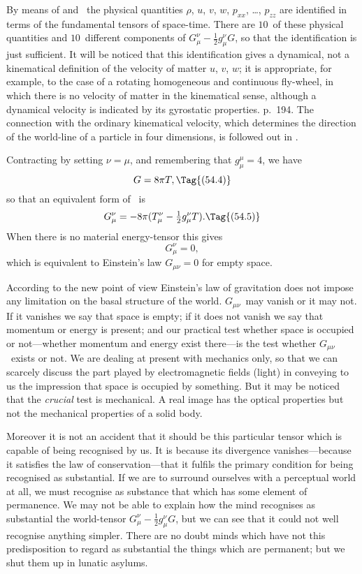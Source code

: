 \documentclass[12pt]{book}
\begin{document}
By means of  and~ the physical quantities $\rho$, $u$, $v$, $w$, $p_{xx}$, \dots, $p_{zz}$
are identified in terms of the fundamental tensors of space-time. There are $10$~of
these physical quantities and $10$~different components of $G_{\mu}^{\nu} - \frac{1}{2}g_{\mu}^{\nu} G$, so that
the identification is just sufficient. It will be noticed that this identification
gives a dynamical, not a kinematical definition of the velocity of matter
$u$, $v$, $w$; it is appropriate, for example, to the case of a rotating homogeneous
and continuous fly-wheel, in which there is no velocity of matter in the kinematical
sense, although a dynamical velocity is indicated by its gyrostatic
%
properties\footnotemark.\footnotetext
  { p.~194.}
The connection with the ordinary kinematical velocity, which
%
determines the direction of the world-line of a particle in four dimensions, is
followed out in .

Contracting  by setting $\nu = \mu$, and remembering that $g_{\mu}^{\mu} = 4$, we have
\[
G = 8\pi T,
\Tag{(54.4)}
\]
so that an equivalent form of~ is
\[
G_{\mu}^{\nu} = -8\pi(T_{\mu}^{\nu} - \tfrac{1}{2} g_{\mu}^{\nu}T).
\Tag{(54.5)}
\]
When there is no material energy\hyp{}tensor this gives
\[
G_{\mu}^{\nu} = 0,
\]
which is equivalent to Einstein's law $G_{\mu\nu} = 0$ for empty space.

According to the new point of view Einstein's law of gravitation does not
impose any limitation on the basal structure of the world. $G_{\mu\nu}$~may vanish or
it may not. If it vanishes we say that space is empty; if it does not vanish
we say that momentum or energy is present; and our practical test whether
space is occupied or not---whether momentum and energy exist there---is the
test whether $G_{\mu\nu}$~exists or not\footnotemark.\footnotetext
  {We are dealing at present with mechanics only, so that we can scarcely discuss the part
  played by electromagnetic fields (light) in conveying to us the impression that space is occupied
  by something. But it may be noticed that the \emph{crucial} test is mechanical. A real image has the
  optical properties but not the mechanical properties of a solid body.}

Moreover it is not an accident that it should be this particular tensor
which is capable of being recognised by us. It is because its divergence
vanishes---because it satisfies the law of conservation---that it fulfils the
primary condition for being recognised as substantial. If we are to surround
ourselves with a perceptual world at all, we must recognise as substance that
which has some element of permanence. We may not be able to explain how
the mind recognises as substantial the world\hyp{}tensor $G_{\mu}^{\nu} - \frac{1}{2}g_{\mu}^{\nu} G$, but we can
see that it could not well recognise anything simpler. There are no doubt
minds which have not this predisposition to regard as substantial the things
which are permanent; but we shut them up in lunatic asylums.
\end{document}
